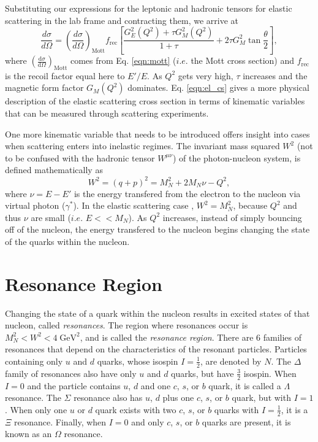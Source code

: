 Substituting our expressions for the leptonic and hadronic tensors for elastic scattering in the lab frame and contracting them, we arrive at
\begin{equation}
\label{eqn:el_cs}
\frac{d\sigma}{d\Omega} = \left( \frac{d\sigma}{d\Omega} \right)_{\mathrm{Mott}} f_{\mathrm{rec}} \left[ \frac{G_E^2(Q^2) + \tau G_M^2(Q^2)}{1+\tau} + 2\tau G_M^2 \tan \frac{\theta}{2} \right],
\end{equation}
where $\left( \tfrac{\mathrm{d}\sigma}{\mathrm{d}\Omega} \right)_{\mathrm{Mott}}$ comes from Eq. \ref{eqn:mott} ($i.e.$ the Mott cross section) and $f_{\mathrm{rec}}$ is the recoil factor equal here to $E'/E$. As $Q^2$ gets very high, $\tau$ increases and the magnetic form factor $G_M(Q^2)$ dominates. Eq. \ref{eqn:el_cs} gives a more physical description of the elastic scattering cross section in terms of kinematic variables that can be measured through scattering experiments.

One more kinematic variable that needs to be introduced offers insight into cases when scattering enters into inelastic regimes. The invariant mass squared $W^2$ (not to be confused with the hadronic tensor $W^{\mu\nu}$) of the photon-nucleon system, is defined mathematically as 
\begin{equation}
W^2 = (q+p)^2 =M_N^2 + 2M_N\nu - Q^2,
\end{equation}
where $\nu = E-E'$ is the energy transfered from the electron to the nucleon via virtual photon ($\gamma^*$). In the elastic scattering case , $W^2 = M_N^2$, because $Q^2$ and thus $\nu$ are small ($i.e.$ $E << M_N$). As $Q^2$ increases, instead of simply bouncing off of the nucleon, the energy transfered to the nucleon begins changing the state of the quarks within the nucleon. 

\section{Resonance Region}
Changing the state of a quark within the nucleon results in excited states of that nucleon, called \textit{resonances}. The region where resonances occur is $M_N^2 < W^2 < 4 \; \mathrm{GeV}^2$, and is called the \textit{resonance region}. There are 6 families of resonances that depend on the characteristics of the resonant particles. Particles containing only $u$ and $d$ quarks, whose isospin $I= \tfrac{1}{2}$, are denoted by $N$. The $\Delta$ family of resonances also have only $u$ and $d$ quarks, but have $\tfrac{3}{2}$ isospin. When $I=0$ and the particle contains $u$, $d$ and one $c$, $s$, or $b$ quark, it is called a $\Lambda$ resonance. The $\Sigma$ resonance also has $u$, $d$ plus one $c$, $s$, or $b$ quark, but with $I=1$. When only one $u$ or $d$ quark exists with two $c$, $s$, or $b$ quarks with $I=\tfrac{1}{2}$, it is a $\Xi$ resonance. Finally, when $I=0$ and only $c$, $s$, or $b$ quarks are present, it is known as an $\Omega$ resonance\cite{PDG}.

